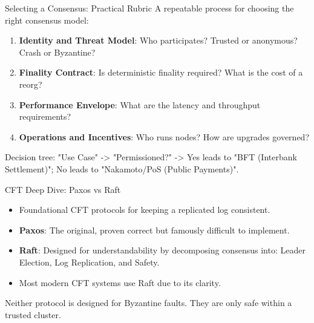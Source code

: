 \documentclass[aspectratio=169]{beamer}
\newcommand{\placeholdergraphic}[2][\linewidth]{%
  \begin{tcolorbox}[
    enhanced, colback=white, colframe=usmagray,
    title=Graphic placeholder, width=#1, sharp corners,
    boxrule=0.5pt, left=4pt,right=4pt,top=6pt,bottom=6pt
  ]
    \footnotesize #2
  \end{tcolorbox}
}
\begin{document}
\begin{frame}{Selecting a Consensus: Practical Rubric}
    A repeatable process for choosing the right consensus model:
    \begin{enumerate}
        \item \textbf{Identity and Threat Model}: Who participates? Trusted or anonymous? Crash or Byzantine?
        \item \textbf{Finality Contract}: Is deterministic finality required? What is the cost of a reorg?
        \item \textbf{Performance Envelope}: What are the latency and throughput requirements?
        \item \textbf{Operations and Incentives}: Who runs nodes? How are upgrades governed?
    \end{enumerate}
    \vfill
    \placeholdergraphic{Decision tree: "Use Case" -> "Permissioned?" -> Yes leads to "BFT (Interbank Settlement)"; No leads to "Nakamoto/PoS (Public Payments)".}
\end{frame}

\begin{frame}{CFT Deep Dive: Paxos vs Raft}
    \begin{itemize}
        \item Foundational CFT protocols for keeping a replicated log consistent.
        \item \textbf{Paxos}: The original, proven correct but famously difficult to implement.
        \item \textbf{Raft}: Designed for understandability by decomposing consensus into: Leader Election, Log Replication, and Safety.
        \item Most modern CFT systems use Raft due to its clarity.
    \end{itemize}
    \vfill
    \begin{tcolorbox}[enhanced, colback=d2s.fg!30, colframe=black, fonttitle=\bfseries, title={Shared Limitation}, rounded corners, drop shadow]
    Neither protocol is designed for Byzantine faults. They are only safe within a trusted cluster.
    \end{tcolorbox}
\end{frame}
\end{document}
